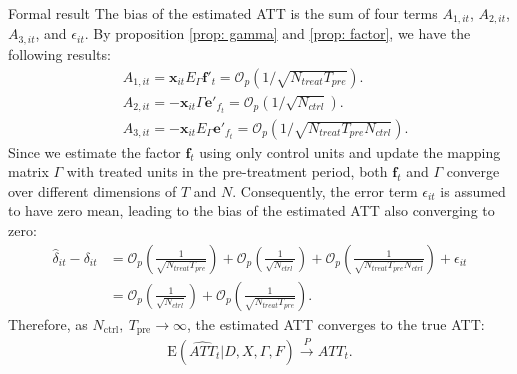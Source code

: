 \documentclass{beamer}
\begin{document}
\begin{frame}{Formal result}
\footnotesize
The bias of the estimated ATT is the sum of four terms $A_{1,it}$, $A_{2,it}$, $A_{3,it}$, and $\epsilon_{it}$. By proposition \ref{prop: gamma} and \ref{prop: factor}, we have the following results:
\begin{equation*}
\begin{aligned}
    &A_{1,it} = \boldsymbol{x}_{it}E_{\Gamma}\boldsymbol{f}'_t = \mathcal{O}_p\left(1/\sqrt{N_{treat}T_{pre}}\right). \\
    &A_{2,it} = -\boldsymbol{x}_{it}\Gamma \boldsymbol{e}'_{f_t} = \mathcal{O}_p\left(1/\sqrt{N_{ctrl}}\right). \\
    &A_{3,it} = -\boldsymbol{x}_{it}E_{\Gamma}\boldsymbol{e}'_{f_t} = \mathcal{O}_p\left(1/\sqrt{N_{treat}T_{pre}N_{ctrl}}\right).
\end{aligned}
\end{equation*}
Since we estimate the factor $\boldsymbol{f}_t$ using only control units and update the mapping matrix $\Gamma$ with treated units in the pre-treatment period, both $\boldsymbol{f}_t$ and $\Gamma$ converge over different dimensions of $T$ and $N$. Consequently, the error term $\epsilon_{it}$ is assumed to have zero mean, leading to the bias of the estimated ATT also converging to zero:
\begin{equation*}
\begin{aligned}
    \hat{\delta}_{it} - \delta_{it} &= \mathcal{O}_p\left(\frac{1}{\sqrt{N_{treat}T_{pre}}}\right) + \mathcal{O}_p\left(\frac{1}{\sqrt{N_{ctrl}}}\right) + \mathcal{O}_p\left(\frac{1}{\sqrt{N_{treat}T_{pre}N_{ctrl}}}\right) + \epsilon_{it} \\
    &= \mathcal{O}_p\left(\frac{1}{\sqrt{N_{ctrl}}} \right) + \mathcal{O}_p\left(\frac{1}{\sqrt{N_{treat}T_{pre}}} \right).
\end{aligned}
\end{equation*}
Therefore, as $N_{\text{ctrl}}, \ T_{\text{pre}} \to \infty$, the estimated ATT converges to the true ATT:
\begin{equation*}
\begin{aligned}
    \mathrm{E}\left(\widehat{ATT}_{t} | D, X, \Gamma, F\right) \xrightarrow{P} ATT_{t}.
\end{aligned}
\end{equation*}
\end{frame}
\end{document}
